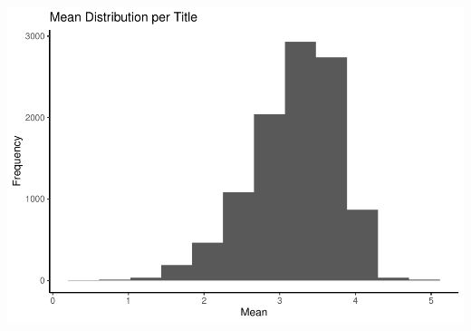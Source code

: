 \documentclass[
]{article}
\begin{document}
\begin{center}\includegraphics{MovieLens-Project-Report_files/figure-latex/unnamed-chunk-22-1} \end{center}
\end{document}
